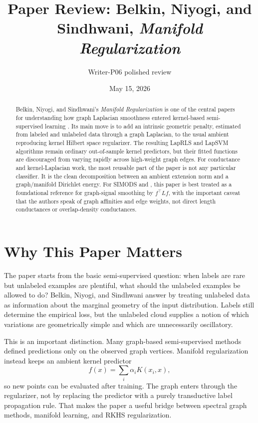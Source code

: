 \documentclass[11pt]{article}
\title{Paper Review: Belkin, Niyogi, and Sindhwani, \emph{Manifold Regularization}}
\author{Writer-P06 polished review}
\date{May 15, 2026}
\begin{document}
\maketitle

\begin{abstract}
Belkin, Niyogi, and Sindhwani's \emph{Manifold Regularization} is one of the
central papers for understanding how graph Laplacian smoothness entered
kernel-based semi-supervised learning \citep{belkin2006manifold}.  Its main
move is to add an intrinsic geometric penalty, estimated from labeled and
unlabeled data through a graph Laplacian, to the usual ambient reproducing
kernel Hilbert space regularizer.  The resulting LapRLS and LapSVM algorithms
remain ordinary out-of-sample kernel predictors, but their fitted functions are
discouraged from varying rapidly across high-weight graph edges.  For
conductance and kernel-Laplacian work, the most reusable part of the paper is
not any particular classifier.  It is the clean decomposition between an
ambient extension norm and a graph/manifold Dirichlet energy.  For SIMODS and
, this paper is best treated as a foundational reference for
graph-signal smoothing by $f^\top L f$, with the important caveat that the
authors speak of graph affinities and edge weights, not direct length
conductances or overlap-density conductances.
\end{abstract}

\section{Why This Paper Matters}

The paper starts from the basic semi-supervised question: when labels are rare
but unlabeled examples are plentiful, what should the unlabeled examples be
allowed to do?  Belkin, Niyogi, and Sindhwani answer by treating unlabeled
data as information about the marginal geometry of the input distribution.
Labels still determine the empirical loss, but the unlabeled cloud supplies a
notion of which variations are geometrically simple and which are
unnecessarily oscillatory.

This is an important distinction.  Many graph-based semi-supervised methods
defined predictions only on the observed graph vertices.  Manifold
regularization instead keeps an ambient kernel predictor
\[
  f(x) = \sum_i \alpha_i K(x_i,x),
\]
so new points can be evaluated after training.  The graph enters through the
regularizer, not by replacing the predictor with a purely transductive label
propagation rule.  That makes the paper a useful bridge between spectral graph
methods, manifold learning, and RKHS regularization.
\end{document}
